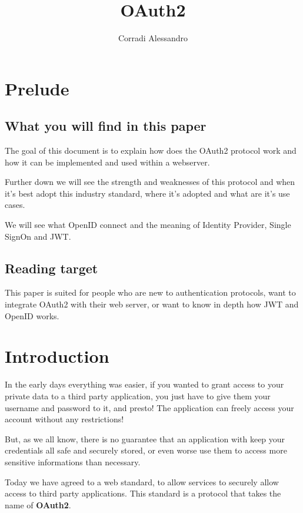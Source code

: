\documentclass[11pt]{style}
\title{OAuth2}
\author{Corradi Alessandro}
\begin{document}
\maketitle{}
\tableofcontents
\clearpage
{}


\section{Prelude}
\subsection{What you will find in this paper}
The goal of this document is to explain how does the OAuth2 protocol work and
how it can be implemented and used within a webserver.

Further down we will see the strength and weaknesses of this protocol and when
it's best adopt this industry standard, where it's adopted and what are it's use
cases.

We will see what OpenID connect and the meaning of Identity Provider, Single SignOn
and JWT.
\subsection{Reading target}
This paper is suited for people who are new to authentication protocols, want to
integrate OAuth2 with their web server, or want to know in depth how JWT and
OpenID works.

\section{Introduction}
In the early days everything was easier, if you wanted to grant access to your
private data to a third party application, you just have to give them your
username and password to it, and presto! The application can freely access your
account without any restrictions!

But, as we all know, there is no guarantee that an application with keep your
credentials all safe and securely stored, or even worse use them to access more
sensitive informations than necessary.

Today we have agreed to a web standard, to allow services to securely allow
access to third party applications.
This standard is a protocol that takes the name of \textbf{OAuth2}.
\end{document}

